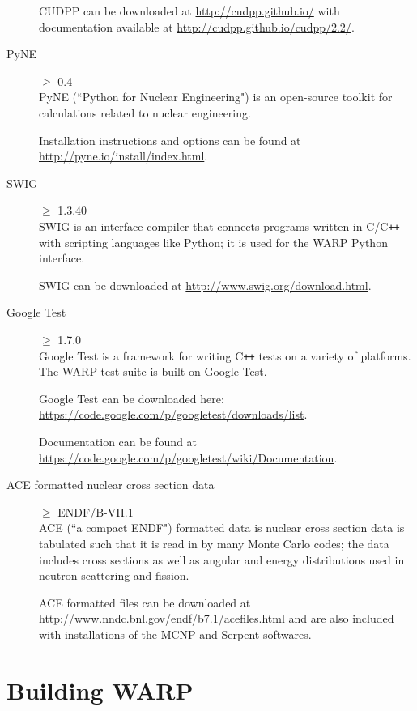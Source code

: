 \documentclass[twoside,a4paper]{refart}
\begin{document}
\begin{description}
CUDPP can be downloaded at \url{http://cudpp.github.io/} with documentation available at 
\url{http://cudpp.github.io/cudpp/2.2/}.

\item[PyNE]$\ge$ 0.4 \\
PyNE (``Python for Nuclear Engineering") is an open-source toolkit for calculations related to nuclear
engineering.

Installation instructions and options can be found at \url{http://pyne.io/install/index.html}.

\item[SWIG]$\ge$ 1.3.40 \\
SWIG is an interface compiler that connects programs written in C/C\texttt{++} with scripting languages
like Python; it is used for the WARP Python interface.

SWIG can be downloaded at \url{http://www.swig.org/download.html}.

\item[Google Test]$\ge$ 1.7.0 \\
Google Test is a framework for writing C\texttt{++} tests on a variety of platforms. The WARP test suite
is built on Google Test.

Google Test can be downloaded here: \url{https://code.google.com/p/googletest/downloads/list}.

Documentation can be found at \url{https://code.google.com/p/googletest/wiki/Documentation}.

\item[ACE formatted nuclear cross section data]
$\ge$ ENDF/B-VII.1 \\
ACE (``a compact ENDF") formatted data is nuclear cross section data is tabulated such that it is read in 
by many Monte Carlo codes; the data includes cross sections as well as angular and energy distributions 
used in neutron scattering and fission.

ACE formatted files can be downloaded at \url{http://www.nndc.bnl.gov/endf/b7.1/acefiles.html} and are 
also included with installations of the MCNP and Serpent softwares.
 
\end{description}

\section{Building WARP}
\end{document}
